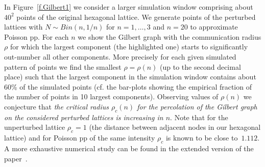 \documentclass[conference]{IEEEtran}
\begin{document}
In Figure~\ref{f.Gilbert1} we consider a larger
simulation window comprising  about $40^2$ points of the original
hexagonal lattice. We generate  points of the perturbed lattices
with $N\sim Bin(n,1/n)$ for $n=1,\ldots,3$ and $n=20$ to
approximate Poisson pp. For each $n$ we show
the  Gilbert graph with the communication radius 
 $\rho$ for which the largest component  (the highlighted one)
starts to significantly out-number all other components.
More precisely for each given simulated pattern of points we find 
the smallest $\rho=\rho(n)$ (up to the second decimal place) 
such that the largest component in the simulation window 
contains about 60\% of the simulated points 
(cf. the bar-plots showing the empirical
fraction of the number of points in 10 largest components). 
Observing values of $\rho(n)$ we conjecture that  {\em the critical
  radius $\rho_c(n)$ for the 
  percolation of the Gilbert graph on the considered perturbed
  lattices  is increasing in $n$}. 
Note that for the unperturbed lattice $\rho_c=1$ (the
distance between adjacent nodes in our hexagonal lattice) and for
Poisson pp of the same intensity  $\rho_c$ is known to be close
to~$1.112$.  A more exhaustive numerical study can be found in the
extended version of the paper~\cite{subpoisson-ext}.
  
\end{document}
